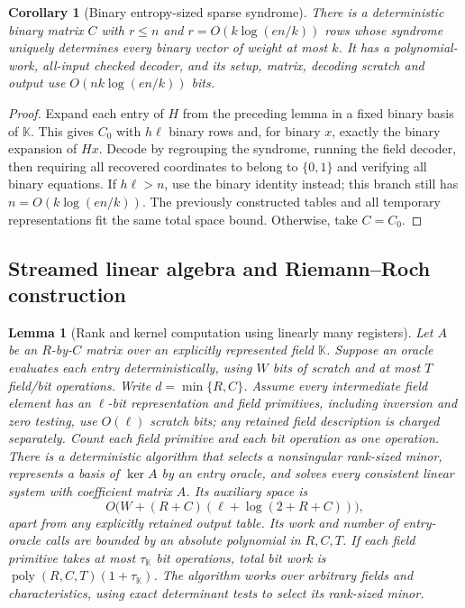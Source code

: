 \documentclass[11pt,letterpaper]{article}
\newtheorem{lemma}[theorem]{Lemma}
\newtheorem{corollary}[theorem]{Corollary}
\numberwithin{equation}{section}
\newcommand{\poly}{\operatorname{poly}}
\begin{document}
\begin{corollary}[Binary entropy-sized sparse syndrome]
\label{cor:binary-entropy-codec}
There is a deterministic binary matrix $C$ with $r\le n$ and $r=O(k\log(en/k))$ rows whose syndrome uniquely determines every binary vector of weight at most $k$.
It has a polynomial-work, all-input checked decoder, and its setup, matrix, decoding scratch and output use $O(nk\log(en/k))$ bits.
\end{corollary}
\begin{proof}
Expand each entry of $H$ from the preceding lemma in a fixed binary basis of $\mathbb K$.
This gives $C_0$ with $h\ell$ binary rows and, for binary $x$, exactly the binary expansion of $Hx$.
Decode by regrouping the syndrome, running the field decoder, then requiring all recovered coordinates to belong to $\{0,1\}$ and verifying all binary equations.
If $h\ell>n$, use the binary identity instead; this branch still has $n=O(k\log(en/k))$.
The previously constructed tables and all temporary representations fit the same total space bound.
Otherwise, take $C=C_0$.
\end{proof}

\subsection{Streamed linear algebra and Riemann--Roch construction}
\label{sec:entry-oracle-linear-algebra}

\begin{lemma}[Rank and kernel computation using linearly many registers]
\label{lem:entry-oracle-kernel}
Let $A$ be an $R$-by-$C$ matrix over an explicitly represented field $\mathbb K$.
Suppose an oracle evaluates each entry deterministically, using $W$ bits of scratch and at most $T$ field/bit operations.
Write $d=\min\{R,C\}$.
Assume every intermediate field element has an $\ell$-bit representation and field primitives, including inversion and zero testing, use $O(\ell)$ scratch bits; any retained field description is charged separately.
Count each field primitive and each bit operation as one operation.
There is a deterministic algorithm that selects a nonsingular rank-sized minor, represents a basis of $\ker A$ by an entry oracle, and solves every consistent linear system with coefficient matrix $A$.
Its auxiliary space is
\[
 O\bigl(W+(R+C)(\ell+\log(2+R+C))\bigr),
\]
apart from any explicitly retained output table.
Its work and number of entry-oracle calls are bounded by an absolute polynomial in $R,C,T$.
If each field primitive takes at most $\tau_{\mathbb K}$ bit operations, total bit work is $\poly(R,C,T)(1+\tau_{\mathbb K})$.
The algorithm works over arbitrary fields and characteristics, using exact determinant tests to select its rank-sized minor.
\end{lemma}
\end{document}
